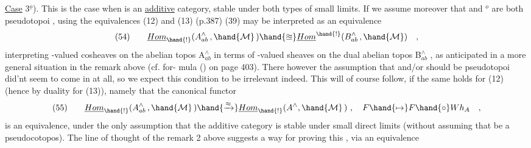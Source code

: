 \uline{Case} 3$^{\underline{o}}$). This is the case when  is an \uline{additive} category,
stable under both types of small limits. If we assume moreover that
  and $^{o}$ are both pseudotopoi , using the equivalences (12)
and (13) (p.387)\hand{,} (39) may be interpreted as an equivalence
\[ (54) \qquad \underline{Hom}_{\hand{!}}(A^{\wedge}_{ab}\, ,\hand{\mathcal{M}}\,) \hand{\approxeq} \underline{Hom}^{\hand{!}}(B^{\wedge}_{ab}\, ,\hand{\mathcal{M}}) \quad , \]
interpreting  -valued cosheaves on the abelian topos A$^\wedge_{ab}$
in terms of  -valued sheaves on the dual abelian topos B$^\wedge_{ab}$ ,
as anticipated in a more general situation in the remark above (cf. for-%
mula (\unsure{***}) on page 403). There however the assumption that  and/or 
should be pseudotopoi did'nt seem to come in at all, so we expect this
condition to be irrelevant indeed. This will of course follow, if the
same holds for (12) (hence by duality for (13)), namely that the
canonical functor
\[ (55) \qquad \underline{Hom}_{\hand{!}}(A^{\wedge}_{ab}\, ,\hand{\mathcal{M}}\,) \hand{\xrightarrow{\approx}} \underline{Hom}_{\hand{!}}(A^{\wedge},\hand{\mathcal{M}}\,) \ , \quad F\hand{\mapsto} F\hand{\circ}Wh_{A} \quad , \]
is an equivalence, under the only assumption that the additive category
 is stable under small direct limits (without assuming that  be a
pseudocotopos). The line of thought of the remark 2 above suggests
a way for proving this , via an equivalence

